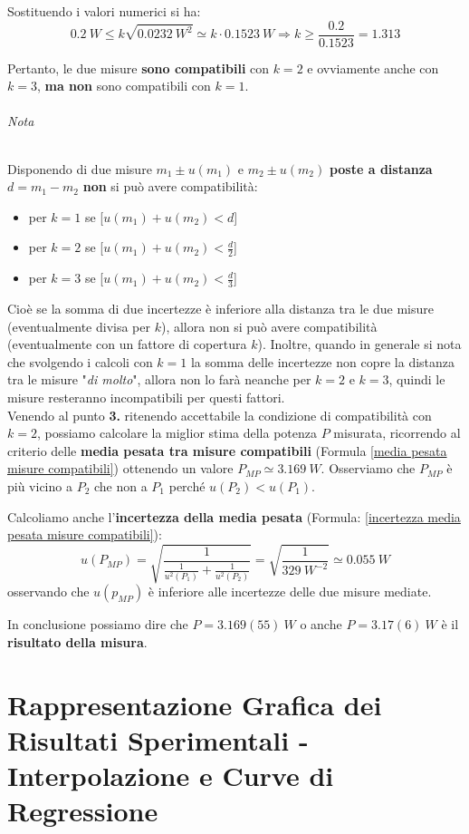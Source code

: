 \documentclass[a4paper,11pt]{report}
\begin{document}
Sostituendo i valori numerici si ha:
$$
  0.2~W \le k\sqrt{0.0232~W^2} \simeq k\cdot0.1523~W \Rightarrow k \ge \frac{0.2}{0.1523} = 1.313
$$

Pertanto, le due misure \textbf{sono compatibili} con $k=2$ e ovviamente anche con $k=3$, \textbf{ma non} sono compatibili con $k=1$.
\subparagraph{Nota} Disponendo di due misure $m_1\pm u(m_1)$ e $m_2\pm u(m_2)$ \textbf{poste a distanza} $d = m_1 - m_2$ \textbf{non} si può avere compatibilità:
\begin{itemize}
  \item per $k=1$ se [$u(m_1)+u(m_2) < d$]
  \item per $k=2$ se [$u(m_1)+u(m_2) < \frac{d}{2}$]
  \item per $k=3$ se [$u(m_1)+u(m_2) < \frac{d}{3}$]
\end{itemize}
Cioè se la somma di due incertezze è inferiore alla distanza tra le due misure (eventualmente divisa per $k$), allora non si può avere compatibilità (eventualmente con un fattore di copertura $k$). Inoltre, quando in generale si nota che svolgendo i calcoli con $k = 1$ la somma delle incertezze non copre la distanza tra le misure "\textit{di molto}", allora non lo farà neanche per $k=2$ e $k=3$, quindi le misure resteranno incompatibili per questi fattori.
\\

Venendo al punto \textbf{3.} ritenendo accettabile la condizione di compatibilità con $k=2$, possiamo calcolare la miglior stima della potenza $P$ misurata, ricorrendo al criterio delle \textbf{media pesata tra misure compatibili} (Formula \ref{media pesata misure compatibili}) ottenendo un valore $P_{MP} \simeq 3.169~W$. Osserviamo che $P_{MP}$ è più vicino a $P_2$ che non a $P_1$ perché $u(P_2)<u(P_1)$.

Calcoliamo anche l'\textbf{incertezza della media pesata} (Formula: \ref{incertezza media pesata misure compatibili}):
$$
  u(P_{MP}) = \sqrt{\frac{1}{\frac{1}{u^2(P_1)}+\frac{1}{u^2(P_2)}}} = \sqrt{\frac{1}{329~W^{-2}}} \simeq 0.055~W
$$
osservando che $u(p_{MP})$ è inferiore alle incertezze delle due misure mediate.

In conclusione possiamo dire che $P = 3.169(55)~W$ o anche $P=3.17(6)~W$ è il \textbf{risultato della misura}.
\chapter{Rappresentazione Grafica dei Risultati Sperimentali - Interpolazione e Curve di Regressione}
\end{document}
